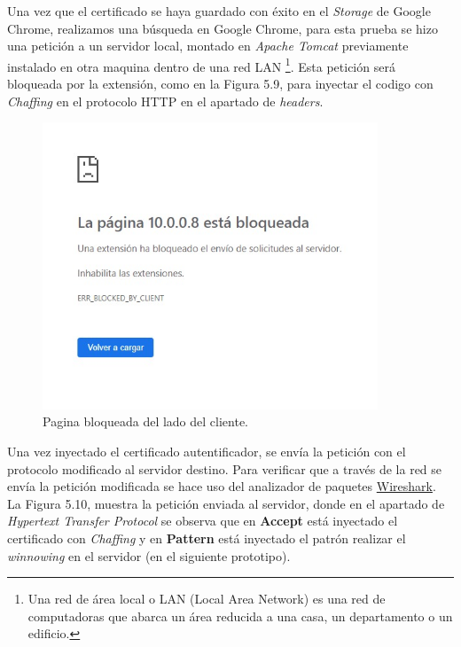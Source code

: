\documentclass[12pt, a4paper, titlepage]{report}
\begin{document}
        	Una vez que el certificado se haya guardado con éxito en el \textit{Storage} de Google Chrome, realizamos una búsqueda en Google Chrome, para esta prueba se hizo una petición a un servidor local, montado en \textit{Apache Tomcat} previamente instalado en otra maquina dentro de una red LAN \footnote{Una red de área local o LAN (Local Area Network) es una red de computadoras que abarca un área reducida a una casa, un departamento o un edificio.}. Esta petición será bloqueada por la extensión, como en la Figura 5.9, para inyectar el codigo con \textit{Chaffing} en el protocolo HTTP en el apartado de \textit{headers}.
	
            \begin{figure}[H]
        		\begin{center}	\includegraphics[width=10cm]{./imagenes/Pruebas/Prototipo_2/pageBlocked.jpeg}
        			\caption{Pagina bloqueada del lado del cliente.}
        		\end{center}
        	\end{figure}
    
            Una vez inyectado el certificado autentificador, se envía la petición con el protocolo modificado al servidor destino. Para verificar que a través de la red se envía la petición modificada se hace uso del analizador de paquetes \hyperref[WiresharkDefinition]{Wireshark}.\\ La Figura 5.10, muestra la petición enviada al servidor, donde en el apartado de \textit{Hypertext Transfer Protocol} se observa que en \textbf{Accept} está inyectado el certificado con \textit{Chaffing} y en \textbf{Pattern} está inyectado el patrón realizar el \textit{winnowing} en el servidor (en el siguiente prototipo).
    
\end{document}
